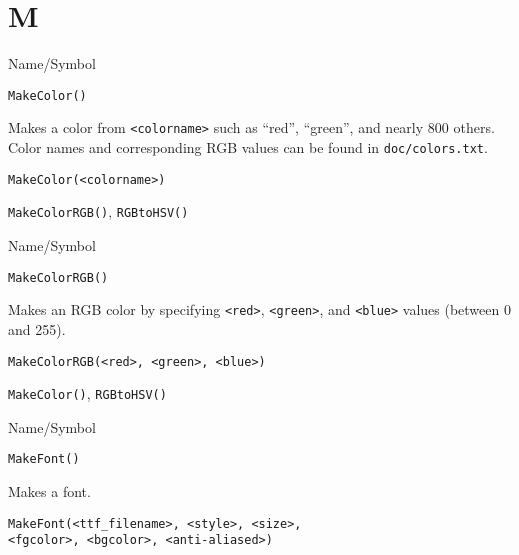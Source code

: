 \rl

\section{M}
\rl




\begin{desc}{Name/Symbol}
\item[Name/Symbol]	\verb+MakeColor()+

\item[Description] Makes a color from \verb+<colorname>+ such as
  ``red'', ``green'', and nearly 800 others.  Color names and
  corresponding RGB values can be found in \verb+doc/colors.txt+.

\item[Usage]
\begin{verbatim}
MakeColor(<colorname>)
\end{verbatim}

\item[Example]	

\item[See Also]	\verb+MakeColorRGB()+, \verb+RGBtoHSV()+
\end{desc}

\rl


\begin{desc}{Name/Symbol}
\item[Name/Symbol]	\verb+MakeColorRGB()+ 

\item[Description] Makes an RGB color by specifying \verb+<red>+,
  \verb+<green>+, and \verb+<blue>+ values (between 0 and 255).

\item[Usage]		
\begin{verbatim}
MakeColorRGB(<red>, <green>, <blue>)
\end{verbatim}

\item[Example]	

\item[See Also]	\verb+MakeColor()+, \verb+RGBtoHSV()+
\end{desc}

\rl





\begin{desc}{Name/Symbol}
\item[Name/Symbol]	\verb+MakeFont()+

\item[Description]	Makes a font.

\item[Usage]
\begin{verbatim}
MakeFont(<ttf_filename>, <style>, <size>, 
<fgcolor>, <bgcolor>, <anti-aliased>)
\end{verbatim}

\item[Example]	

\item[See Also]	
\end{desc}

